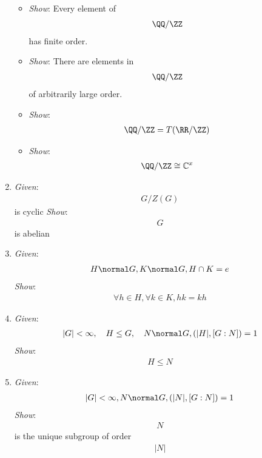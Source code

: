 \begin{enumerate}
  \begin{itemize}
  \tightlist
  \item
    \emph{Show}: Every element of \begin{align*}\QQ/\ZZ\end{align*} has
    finite order.
  \item
    \emph{Show}: There are elements in \begin{align*}\QQ/\ZZ\end{align*}
    of arbitrarily large order.
  \item
    \emph{Show}: \begin{align*}\QQ/\ZZ = T(\RR/\ZZ)\end{align*}
  \item
    \emph{Show}: \begin{align*}\QQ/\ZZ \cong \mathbb{C}^x\end{align*}
  \end{itemize}
\item
  \emph{Given}: \begin{align*}G/Z(G)\end{align*} is cyclic \emph{Show}:
  \begin{align*}G\end{align*} is abelian
\item
  \emph{Given}:
  \begin{align*}H \normal G, K \normal G,H \cap K = e\end{align*}
  \emph{Show}:
  \begin{align*}\forall h\in H, \forall k\in K, hk = kh\end{align*}
\item
  \emph{Given}:
  \begin{align*}|G| < \infty, \quad H \leq G, \quad N \normal G, (|H|, [G:N]) = 1\end{align*}
  \emph{Show}: \begin{align*}H \leq N\end{align*}
\item
  \emph{Given}:
  \begin{align*}|G| < \infty, N \normal G, (|N|, [G:N]) =1\end{align*}
  \emph{Show}: \begin{align*}N\end{align*} is the unique subgroup of
  order \begin{align*}|N|\end{align*}
\end{enumerate}


